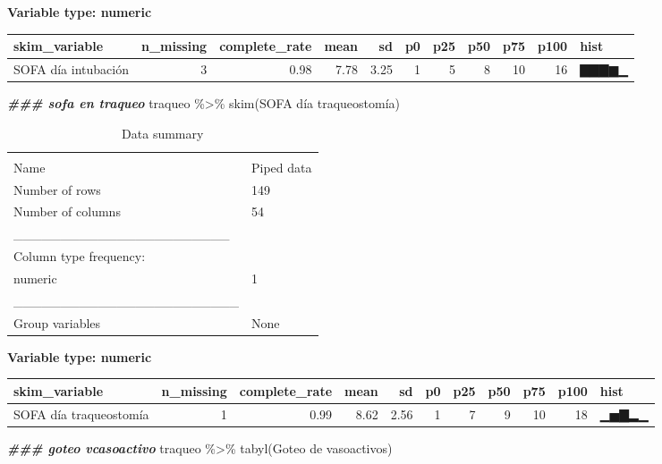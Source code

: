 \documentclass[
]{article}
\newenvironment{Shaded}{\begin{snugshade}}{\end{snugshade}}
\newcommand{\AttributeTok}[1]{\textcolor[rgb]{0.77,0.63,0.00}{#1}}
\newcommand{\DocumentationTok}[1]{\textcolor[rgb]{0.56,0.35,0.01}{\textbf{\textit{#1}}}}
\newcommand{\FunctionTok}[1]{\textcolor[rgb]{0.00,0.00,0.00}{#1}}
\newcommand{\NormalTok}[1]{#1}
\newcommand{\SpecialCharTok}[1]{\textcolor[rgb]{0.00,0.00,0.00}{#1}}
\newcommand{\StringTok}[1]{\textcolor[rgb]{0.31,0.60,0.02}{#1}}
\begin{document}
\textbf{Variable type: numeric}

\begin{longtable}[]{@{}lrrrrrrrrrl@{}}
\toprule
skim\_variable & n\_missing & complete\_rate & mean & sd & p0 & p25 &
p50 & p75 & p100 & hist \\
\midrule
\endhead
SOFA día intubación & 3 & 0.98 & 7.78 & 3.25 & 1 & 5 & 8 & 10 & 16 &
▇▇▇▆▁ \\
\bottomrule
\end{longtable}

\begin{Shaded}
\begin{Highlighting}[]
\DocumentationTok{\#\#\# sofa en traqueo}
\NormalTok{traqueo }\SpecialCharTok{\%\textgreater{}\%}
  \FunctionTok{skim}\NormalTok{(}\StringTok{\textasciigrave{}}\AttributeTok{SOFA día traqueostomía}\StringTok{\textasciigrave{}}\NormalTok{)}
\end{Highlighting}
\end{Shaded}

\begin{longtable}[]{@{}ll@{}}
\caption{Data summary}\tabularnewline
\toprule
& \\
\midrule
\endfirsthead
\toprule
& \\
\midrule
\endhead
Name & Piped data \\
Number of rows & 149 \\
Number of columns & 54 \\
\_\_\_\_\_\_\_\_\_\_\_\_\_\_\_\_\_\_\_\_\_\_\_ & \\
Column type frequency: & \\
numeric & 1 \\
\_\_\_\_\_\_\_\_\_\_\_\_\_\_\_\_\_\_\_\_\_\_\_\_ & \\
Group variables & None \\
\bottomrule
\end{longtable}

\textbf{Variable type: numeric}

\begin{longtable}[]{@{}lrrrrrrrrrl@{}}
\toprule
skim\_variable & n\_missing & complete\_rate & mean & sd & p0 & p25 &
p50 & p75 & p100 & hist \\
\midrule
\endhead
SOFA día traqueostomía & 1 & 0.99 & 8.62 & 2.56 & 1 & 7 & 9 & 10 & 18 &
▁▅▇▂▁ \\
\bottomrule
\end{longtable}

\begin{Shaded}
\begin{Highlighting}[]
\DocumentationTok{\#\#\# goteo vcasoactivo}
\NormalTok{traqueo }\SpecialCharTok{\%\textgreater{}\%}
  \FunctionTok{tabyl}\NormalTok{(}\StringTok{\textasciigrave{}}\AttributeTok{Goteo de vasoactivos}\StringTok{\textasciigrave{}}\NormalTok{)}
\end{Highlighting}
\end{Shaded}
\end{document}
